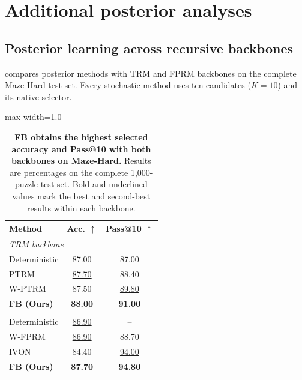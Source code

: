 \section{Additional posterior analyses}
\label{app:posterior-analysis}

\subsection{Posterior learning across recursive backbones}
\label{sec:cross-backbone}

 compares posterior methods with TRM and FPRM backbones on the complete Maze-Hard test set.
Every stochastic method uses ten candidates ($K=10$) and its native selector.

\begin{table}[t]
  \caption{\textbf{FB obtains the highest selected accuracy and Pass@10
  with both backbones on Maze-Hard.} Results are percentages on the complete
  1,000-puzzle test set. Bold and underlined values mark the best and
  second-best results within each backbone.}
  \label{tab:maze-cross-backbone}
  \centering
  \small
  \setlength{\tabcolsep}{22pt}
  \begin{adjustbox}{max width=1.0\linewidth}
  \begin{tabular}{lcc}
    \toprule
    Method & Acc. $\uparrow$ & Pass@10 $\uparrow$ \\
    \midrule
    \multicolumn{3}{l}{\textit{TRM backbone}} \\
    Deterministic            & 87.00 & 87.00 \\
    PTRM                     & \underline{87.70} & 88.40 \\
    W-PTRM                   & 87.50 & \underline{89.80} \\
    \rowcolor{gaerowhighlight}
    \textbf{FB (Ours)}       & \textbf{88.00} & \textbf{91.00} \\
    \addlinespace
    \multicolumn{3}{l}{\textit{FPRM backbone}} \\
    Deterministic            & \underline{86.90} & -- \\
    W-FPRM                   & \underline{86.90} & 88.70 \\
    IVON                     & 84.40 & \underline{94.00} \\
    \rowcolor{gaerowhighlight}
    \textbf{FB (Ours)}       & \textbf{87.70} & \textbf{94.80} \\
    \bottomrule
  \end{tabular}
  \end{adjustbox}
\end{table}

